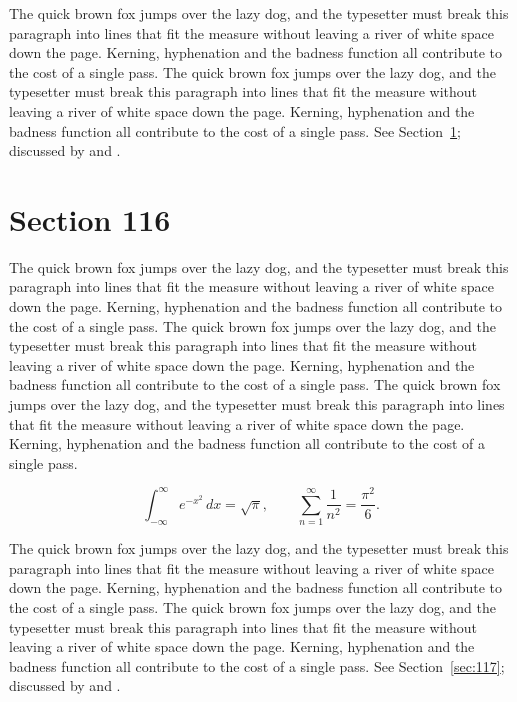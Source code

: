 \documentclass{article}
\begin{document}
The quick brown fox jumps over the lazy dog, and the typesetter must break this paragraph into lines that fit the measure without leaving a river of white space down the page. Kerning, hyphenation and the badness function all contribute to the cost of a single pass. The quick brown fox jumps over the lazy dog, and the typesetter must break this paragraph into lines that fit the measure without leaving a river of white space down the page. Kerning, hyphenation and the badness function all contribute to the cost of a single pass. 
See Section~\ref{sec:116}; discussed by \textcite{k1} and \textcite{l3}.
\section{Section 116}
\label{sec:116}
The quick brown fox jumps over the lazy dog, and the typesetter must break this paragraph into lines that fit the measure without leaving a river of white space down the page. Kerning, hyphenation and the badness function all contribute to the cost of a single pass. The quick brown fox jumps over the lazy dog, and the typesetter must break this paragraph into lines that fit the measure without leaving a river of white space down the page. Kerning, hyphenation and the badness function all contribute to the cost of a single pass. The quick brown fox jumps over the lazy dog, and the typesetter must break this paragraph into lines that fit the measure without leaving a river of white space down the page. Kerning, hyphenation and the badness function all contribute to the cost of a single pass. 

\begin{equation}\label{eq:116}
\int_{-\infty}^{\infty} e^{-x^{2}}\,dx = \sqrt{\pi}, \qquad
\sum_{n=1}^{\infty} \frac{1}{n^{2}} = \frac{\pi^{2}}{6}.
\end{equation}

The quick brown fox jumps over the lazy dog, and the typesetter must break this paragraph into lines that fit the measure without leaving a river of white space down the page. Kerning, hyphenation and the badness function all contribute to the cost of a single pass. The quick brown fox jumps over the lazy dog, and the typesetter must break this paragraph into lines that fit the measure without leaving a river of white space down the page. Kerning, hyphenation and the badness function all contribute to the cost of a single pass. 
See Section~\ref{sec:117}; discussed by \textcite{k2} and \textcite{l4}.
\end{document}
